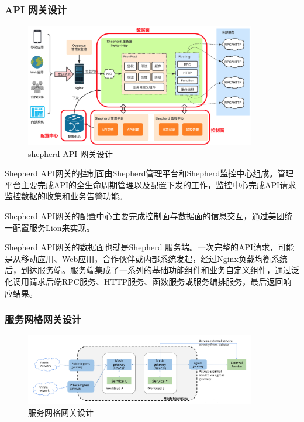 \subsubsection{API 网关设计}

\begin{figure}[H]
    \centering
    \includegraphics[width=0.9\textwidth]{Img/shepherd.png}
    \caption{shepherd API 网关设计}
    \label{fig:shepherd}
\end{figure}

Shepherd API网关的控制面由Shepherd管理平台和Shepherd监控中心组成。管理平台主要完成API的全生命周期管理以及配置下发的工作，监控中心完成API请求监控数据的收集和业务告警功能。\par

Shepherd API网关的配置中心主要完成控制面与数据面的信息交互，通过美团统一配置服务Lion来实现。\par

Shepherd API网关的数据面也就是Shepherd 服务端。一次完整的API请求，可能是从移动应用、Web应用，合作伙伴或内部系统发起，经过Nginx负载均衡系统后，到达服务端。服务端集成了一系列的基础功能组件和业务自定义组件，通过泛化调用请求后端RPC服务、HTTP服务、函数服务或服务编排服务，最后返回响应结果。\par

\subsubsection{服务网格网关设计}

\begin{figure}[H]
    \centering
    \includegraphics[width=0.9\textwidth]{Img/istio_gateway.png}
    \caption{服务网格网关设计}
    \label{fig:istio_gateway}
\end{figure}

